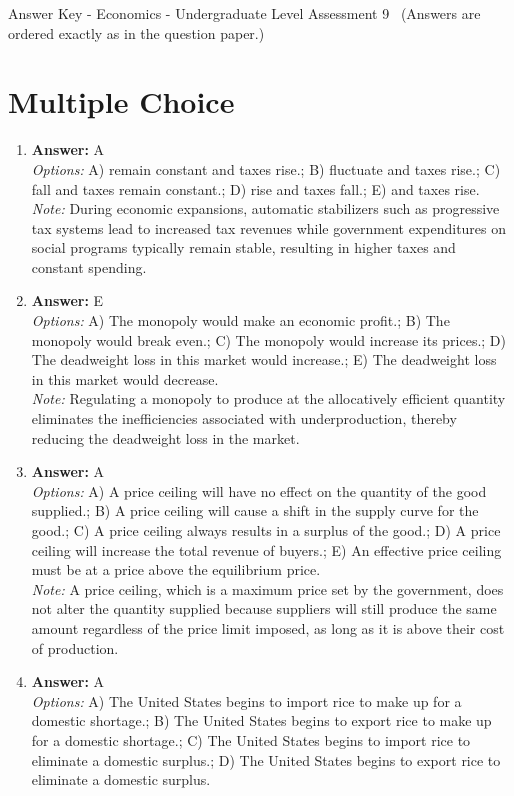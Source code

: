 \documentclass[12pt]{article}
\begin{document}
\begin{center}
Answer Key - Economics - Undergraduate Level Assessment 9 \
\small (Answers are ordered exactly as in the question paper.)
\end{center}

\section*{Multiple Choice}
\begin{enumerate}[label=\arabic*.]
\item \textbf{Answer:} A
\\ \textit{Options:} A) remain constant and taxes rise.; B) fluctuate and taxes rise.; C) fall and taxes remain constant.; D) rise and taxes fall.; E) and taxes rise.
\\ \textit{Note:} During economic expansions, automatic stabilizers such as progressive tax systems lead to increased tax revenues while government expenditures on social programs typically remain stable, resulting in higher taxes and constant spending.
\item \textbf{Answer:} E
\\ \textit{Options:} A) The monopoly would make an economic profit.; B) The monopoly would break even.; C) The monopoly would increase its prices.; D) The deadweight loss in this market would increase.; E) The deadweight loss in this market would decrease.
\\ \textit{Note:} Regulating a monopoly to produce at the allocatively efficient quantity eliminates the inefficiencies associated with underproduction, thereby reducing the deadweight loss in the market.
\item \textbf{Answer:} A
\\ \textit{Options:} A) A price ceiling will have no effect on the quantity of the good supplied.; B) A price ceiling will cause a shift in the supply curve for the good.; C) A price ceiling always results in a surplus of the good.; D) A price ceiling will increase the total revenue of buyers.; E) An effective price ceiling must be at a price above the equilibrium price.
\\ \textit{Note:} A price ceiling, which is a maximum price set by the government, does not alter the quantity supplied because suppliers will still produce the same amount regardless of the price limit imposed, as long as it is above their cost of production.
\item \textbf{Answer:} A
\\ \textit{Options:} A) The United States begins to import rice to make up for a domestic shortage.; B) The United States begins to export rice to make up for a domestic shortage.; C) The United States begins to import rice to eliminate a domestic surplus.; D) The United States begins to export rice to eliminate a domestic surplus.

\end{enumerate}
\end{document}
